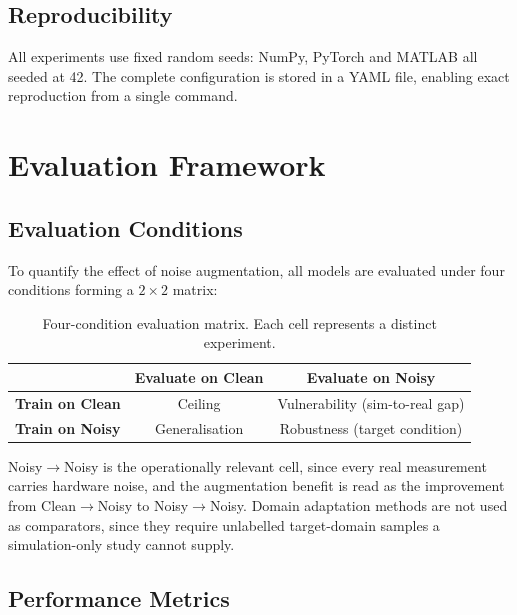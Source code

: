 \subsection{Reproducibility}
\label{sec:method-reproducibility}

All experiments use fixed random seeds: NumPy, PyTorch and MATLAB all seeded at 42. The complete configuration is stored in a YAML file, enabling exact reproduction from a single command.

\section{Evaluation Framework}
\label{sec:method-eval}

\subsection{Evaluation Conditions}
\label{sec:method-eval-conditions}

To quantify the effect of noise augmentation, all models are evaluated under four conditions forming a $2 \times 2$ matrix:

\begin{table}[htbp]
\centering
\caption[Four-condition evaluation matrix]{Four-condition evaluation matrix. Each cell represents a distinct experiment.}
\label{tab:eval-conditions}
\small
\begin{tabular}{@{}lcc@{}}
\toprule
& \textbf{Evaluate on Clean} & \textbf{Evaluate on Noisy} \\
\midrule
\textbf{Train on Clean} & Ceiling & Vulnerability (sim-to-real gap) \\
\textbf{Train on Noisy} & Generalisation & Robustness (target condition) \\
\bottomrule
\end{tabular}
\end{table}


Noisy$\to$Noisy is the operationally relevant cell, since every real measurement carries hardware noise, and the augmentation benefit is read as the improvement from Clean$\to$Noisy to Noisy$\to$Noisy. Domain adaptation methods \parencite{ganin2016, tzeng2017adda} are not used as comparators, since they require unlabelled target-domain samples a simulation-only study cannot supply.


\subsection{Performance Metrics}
\label{sec:method-metrics}

